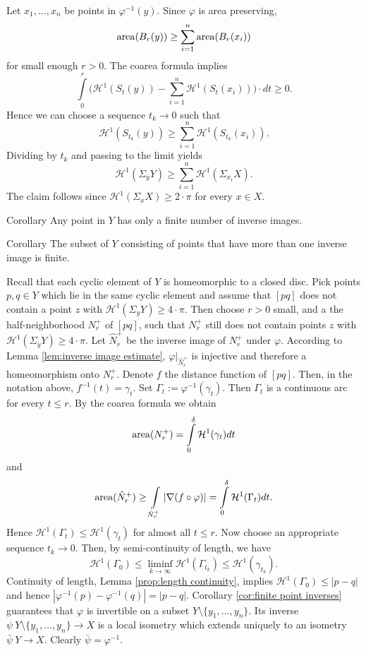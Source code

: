 \documentclass[a4paper,10pt]{amsart}
\begin{document}
Let $x_1,\ldots,x_n$ be points in $\varphi^{-1}(y)$. 
Since $\varphi$
is area preserving, 
\[\mathop{\rm area}\nolimits(B_r(y))\geq\sum_{i=1}^n\mathop{\rm area}\nolimits(B_r(x_i))\]
for small enough $r>0$. 
The coarea formula implies
\[\int\limits_0^r\biggl(\mathcal{H}^1(S_t(y))-\sum_{i=1}^n \mathcal{H}^1(S_t(x_i))\biggr)\cdot dt
\geq 
0.\]
Hence we can choose a sequence $t_k\to 0$ such that 
\[\mathcal{H}^1(S_{t_k}(y))\geq\sum_{i=1}^n \mathcal{H}^1(S_{t_k}(x_i)).\] 
Dividing by $t_k$ and passing to the limit yields 
\[\mathcal{H}^1(\Sigma_y Y)\geq\sum_{i=1}^n\mathcal{H}^1(\Sigma_{x_i}X).\]
The claim follows since $\mathcal{H}^1(\Sigma_{x}X)\geq 2{\cdot}\pi$
for every $x\in X$.
\qeds


\begin{thm}{Corollary}\label{cor:finite point inverses}
Any point in $Y$ has only a finite number of inverse images.
\end{thm}


\begin{thm}{Corollary}\label{cor:finite point inverses}
The subset of $Y$ consisting of points that have more than
one inverse image is finite.
\end{thm}





Recall that each cyclic element of $Y$ is homeomorphic to a closed disc. 
Pick points $p,q\in Y$ which lie in the same cyclic element and assume that
$[pq]$ does not contain a point $z$ with $\mathcal{H}^1(\Sigma_y Y)\geq 4{\cdot}\pi$.
Then choose $r>0$ small, and a the half-neighborhood $N_r^+$ of $[pq]$, 
such that $N_r^+$ still does not contain points $z$ with 
$\mathcal{H}^1(\Sigma_y Y)\geq 4{\cdot}\pi$. Let $\hat N_r^+$ be the inverse image of $N_r^+$
under $\varphi$. According to Lemma \ref{lem:inverse image estimate}, $\varphi|_{\hat N_r^+}$ 
is injective and therefore a homeomorphism onto $N_r^+$. 
Denote $f$ the distance function of $[pq]$. Then, in the notation above, $f^{-1}(t)=\gamma_t$.
Set $\Gamma_t:=\varphi^{-1}(\gamma_t)$. 
Then $\Gamma_t$ is a continuous arc for every $t\leq r$.
By the coarea formula we obtain
$$
\mathop{\rm area}\nolimits(N_r^+)=\int\limits_0^\delta \mathcal{H}^1(\gamma_t)dt
$$
and
$$
\mathop{\rm area}\nolimits(\hat N_r^+)\geq\int\limits_{\hat N_r^+}|\nabla (f\circ\varphi)|
=
\int\limits_0^\delta \mathcal{H}^1(\Gamma_t)dt.
$$
Hence $\mathcal{H}^1(\Gamma_t)\leq \mathcal{H}^1(\gamma_t)$ for almost all $t\leq r$.
Now choose an appropriate sequence $t_k\to 0$. Then, by semi-continuity of length, we have
$$
\mathcal{H}^1(\Gamma_0)\leq \liminf_{k\to\infty}\mathcal{H}^1(\Gamma_{t_k})\leq\mathcal{H}^1(\gamma_{t_k}).
$$
Continuity of length, Lemma \ref{prop:length continuity}, implies
$\mathcal{H}^1(\Gamma_0)\leq|p-q|$ and hence $|\varphi^{-1}(p)-\varphi^{-1}(q)|=|p-q|$. 
Corollary \ref{cor:finite point inverses} guarantees that $\varphi$ is invertible on a subset 
$Y\setminus\{y_1,\ldots,y_n\}$. Its inverse $\psi\:Y\setminus\{y_1,\ldots,y_n\}\to X$ is a local
isometry which extends uniquely to an isometry $\bar\psi\:Y\to X$. Clearly $\bar\psi=\varphi^{-1}$.
\qeds
\end{document}
